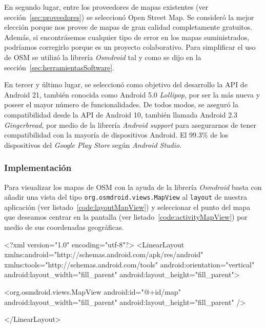 En segundo lugar, entre los proveedores de mapas existentes (ver sección~\ref{sec:proveedores}) se
seleccionó Open Street Map. Se consideró la mejor elección porque nos provee de mapas de gran
calidad completamente gratuitos. Además, si encontrásemos cualquier tipo de error en los mapas
suministrados, podríamos corregirlo porque es un proyecto colaborativo. Para simplificar el uso de
\acs{OSM} se utilizó la librería \emph{Osmdroid} tal y como se dijo en la
sección~\ref{sec:herramientasSoftware}.

En tercer y último lugar, se seleccionó como objetivo del desarrollo la \acs{API} de Android 21,
también conocida como Android 5.0 \emph{Lollipop}, por ser la más nueva y poseer el mayor número de
funcionalidades. De todos modos, se aseguró la compatibilidad desde la \acs{API} de Android 10,
también llamada Android 2.3 \emph{Gingerbread}, por medio de la librería \emph{Android support} para
asegurarnos de tener compatibilidad con la mayoría de dispositivos Android. El 99.3\% de los
dispositivos del \emph{Google Play Store} según \emph{Android Studio}.

\subsubsection{Implementación}

Para visualizar los mapas de \acs{OSM} con la ayuda de la librería \emph{Osmdroid} basta con añadir
una vista del tipo \texttt{org.osmdroid.views.MapView} al \texttt{layout} de nuestra aplicación (ver
listado~\ref{code:layoutMapView}) y seleccionar el punto del mapa que deseamos centrar en la
pantalla (ver listado~\ref{code:activityMapView}) por medio de sus coordenadas geográficas.

\begin{listing}[
  float=ht,
  language = xml,
  caption  = {Ejemplo de \texttt{layout} usando \texttt{org.osmdroid.views.MapView}},
  label    = code:layoutMapView]
<?xml version="1.0" encoding="utf-8"?>
<LinearLayout xmlns:android="http://schemas.android.com/apk/res/android"
        xmlns:tools="http://schemas.android.com/tools"
        android:orientation="vertical" 
        android:layout_width="fill_parent"
        android:layout_height="fill_parent">
        
        <org.osmdroid.views.MapView android:id="@+id/map"
                android:layout_width="fill_parent" 
                android:layout_height="fill_parent" />
                
</LinearLayout>
\end{listing}

